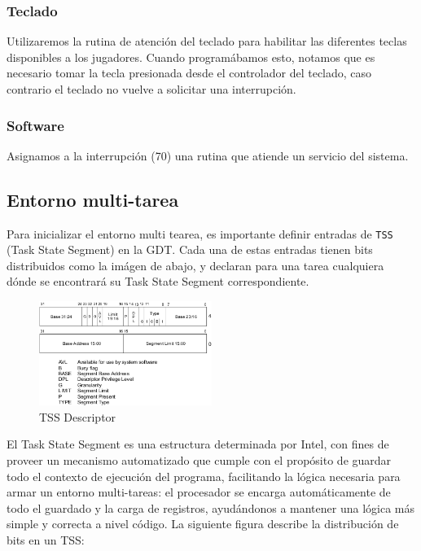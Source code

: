 \subsubsection{Teclado}
Utilizaremos la rutina de atención del teclado para habilitar las diferentes teclas disponibles a los jugadores. Cuando programábamos esto, notamos que es necesario tomar la tecla presionada desde el controlador del teclado, caso contrario el teclado no vuelve a solicitar una interrupción.

\subsubsection{Software}
Asignamos a la interrupción  (70) una rutina que atiende un servicio del sistema.

\subsection{Entorno multi-tarea}

Para inicializar el entorno multi tearea, es importante definir entradas de \texttt{TSS} (Task State Segment) en la GDT. Cada una de estas entradas tienen bits distribuidos como la imágen de abajo, y declaran para una tarea cualquiera dónde se encontrará su Task State Segment correspondiente.

\begin{figure}[H]
  \centering
    \includegraphics[width=0.5\textwidth]{images/tss_descriptor}
  \caption{TSS Descriptor}
\end{figure}

El Task State Segment es una estructura determinada por Intel, con fines de proveer un mecanismo automatizado que cumple con el propósito de guardar todo el contexto de ejecución del programa, facilitando la lógica necesaria para armar un entorno multi-tareas: el procesador se encarga automáticamente de todo el guardado y la carga de registros, ayudándonos a mantener una lógica más simple y correcta a nivel código. La siguiente figura describe la distribución de bits en un TSS:


